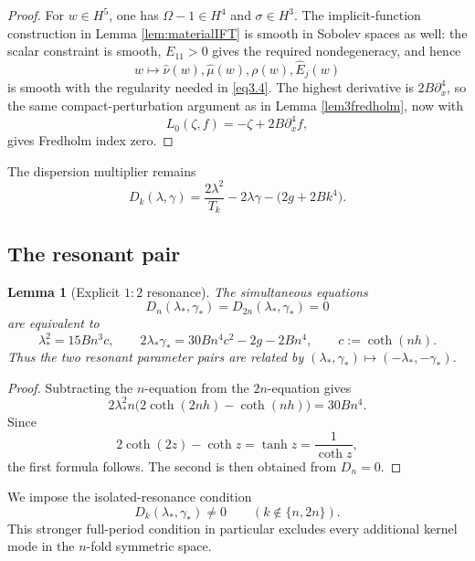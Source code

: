 \documentclass[12pt]{article}
\numberwithin{equation}{section}
\newtheorem{lemma}[theorem]{Lemma}
\numberwithin{equation}{section}
\begin{document}
\begin{proof}
For $w\in H^5$, one has $\Omega-1\in H^4$ and $\sigma\in H^3$.
The implicit-function construction in Lemma \ref{lem:materialIFT} is smooth in Sobolev
spaces as well: the scalar constraint is smooth, $E_{11}>0$ gives the required
nondegeneracy, and hence
\[
w\mapsto
\widehat\nu(w),\widehat\mu(w),\rho(w),\widehat E_j(w)
\]
is smooth with the regularity needed in \eqref{eq3.4}.  The highest derivative is
$2B\partial_x^4$, so the same compact-perturbation argument as in Lemma
\ref{lem3fredholm}, now with
\[
L_0(\zeta,f)=-\zeta+2B\partial_x^4f,
\]
gives Fredholm index zero.
\end{proof}

The dispersion multiplier remains
\begin{equation}\label{eq4.disp}
D_k(\lambda,\gamma)
=
\frac{2\lambda^2}{T_k}
-2\lambda\gamma
-\bigl(2g+2Bk^4\bigr).
\end{equation}

\subsection{The resonant pair}

\begin{lemma}[Explicit $1{:}2$ resonance]\label{lem4respair}
The simultaneous equations
\[
D_n(\lambda_*,\gamma_*)
=
D_{2n}(\lambda_*,\gamma_*)=0
\]
are equivalent to
\begin{equation}\label{eq4.respair}
\lambda_*^2
=
15Bn^3c,
\qquad
2\lambda_*\gamma_*
=
30Bn^4c^2-2g-2Bn^4,
\qquad
c:=\coth(nh).
\end{equation}
Thus the two resonant parameter pairs are related by
$(\lambda_*,\gamma_*)\mapsto(-\lambda_*,-\gamma_*)$.
\end{lemma}

\begin{proof}
Subtracting the $n$-equation from the $2n$-equation gives
\[
2\lambda_*^2n\bigl(2\coth(2nh)-\coth(nh)\bigr)
=
30Bn^4.
\]
Since
\[
2\coth(2z)-\coth z=\tanh z=\frac1{\coth z},
\]
the first formula follows.  The second is then obtained from $D_n=0$.
\end{proof}

We impose the isolated-resonance condition
\begin{equation}\label{eq4.isolated}
D_k(\lambda_*,\gamma_*)\neq0
\qquad
(k\notin\{n,2n\}).
\end{equation}
This stronger full-period condition in particular excludes every additional kernel mode
in the $n$-fold symmetric space.
\end{document}
